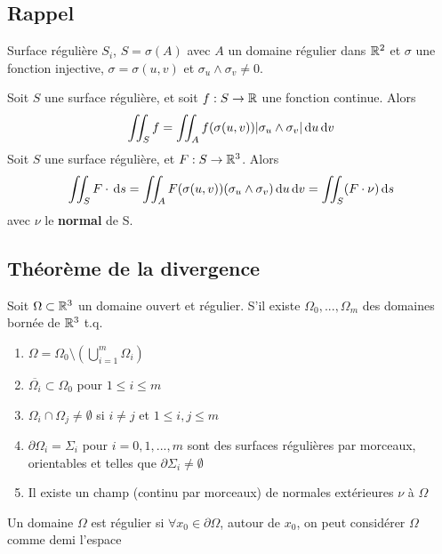 \documentclass[12pt,a4paper]{article}
\begin{document}
\subsection{Rappel}
Surface régulière $S_i$, $S = \sigma(A)$ avec $A$ un domaine régulier dans $\mathbb{R}^2$ et $\sigma$ une fonction injective, $\sigma = \sigma(u,v)$ et $\sigma_u \wedge \sigma_v \neq 0$.
\begin{boite}
	 Soit $S$ une surface régulière, et soit $f: S \to \mathbb{R}$ une fonction continue. Alors 
	\begin{equation}
		\iint_S f = \iint_A f(\sigma(u,v)) |\sigma_u \wedge \sigma_v| \, \mathrm d u\, \mathrm d v
	\end{equation}
	 Soit $S$ une surface régulière, et $F : S \to \mathbb{R}^3$. Alors 
	\begin{equation}
		\iint_S F \cdot \, \mathrm d s = \iint_A F(\sigma(u,v))(\sigma_u \wedge \sigma_v) \, \mathrm d u\, \mathrm d v = \iint_S (F\cdot \nu) \, \mathrm d s
	\end{equation}
	avec $\nu$ le \textbf{normal} de S.
\end{boite}

\subsection{Théorème de la divergence}
\begin{boite}
	 Soit $\Omega \subset \mathbb{R}^3$ un domaine ouvert et régulier. S'il existe $\Omega_0,...,\Omega_m$ des domaines bornée de $\mathbb{R}^3$ t.q. 
	\begin{enumerate}[label=\roman*)]
		\item 	$\Omega = \Omega_0 \setminus (\bigcup_{i=1}^m \Omega_i)$
		\item 	$\overline{\Omega_i} \subset \Omega_0$ pour $1 \leq i \leq m$
		\item 	$\Omega_i \cap \Omega_j \neq\emptyset$ si $i \neq j$ et $1\leq i,j \leq m$
		\item 	$\partial \Omega_i = \Sigma_i$ pour $i = 0,1,...,m$ sont des surfaces régulières par morceaux, orientables et telles que $\partial\Sigma_i \neq \emptyset$
		\item 	Il existe un champ (continu par morceaux) de normales extérieures $\nu$ à $\Omega$
	\end{enumerate}
\end{boite}
 Un domaine $\Omega$ est régulier si $\forall x_0 \in \partial \Omega$, autour de $x_0$, on peut considérer $\Omega$ comme demi l'espace
\end{document}
